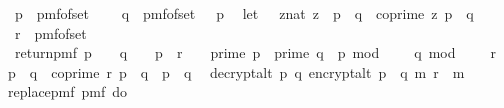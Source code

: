 \begin{isabellebody}
\ \ p\ {\isasymleftarrow}\ pmf{\isacharunderscore}{\kern0pt}of{\isacharunderscore}{\kern0pt}set\ {\isacharquery}{\kern0pt}{\isasymK}{\isacharsemicolon}{\kern0pt}\ \isanewline
\ \ q\ {\isasymleftarrow}\ pmf{\isacharunderscore}{\kern0pt}of{\isacharunderscore}{\kern0pt}set\ {\isacharparenleft}{\kern0pt}{\isacharquery}{\kern0pt}{\isasymK}\ {\isacharminus}{\kern0pt}\ {\isacharbraceleft}{\kern0pt}p{\isacharbraceright}{\kern0pt}{\isacharparenright}{\kern0pt}{\isacharsemicolon}{\kern0pt}\isanewline
\ \ let\ {\isasymZ}\ {\isacharequal}{\kern0pt}\ {\isacharbraceleft}{\kern0pt}{\isacharparenleft}{\kern0pt}z{\isacharcolon}{\kern0pt}{\isacharcolon}{\kern0pt}nat{\isacharparenright}{\kern0pt}{\isachardot}{\kern0pt}\ z\ {\isacharless}{\kern0pt}\ p\ {\isacharasterisk}{\kern0pt}\ q\ {\isasymand}\ coprime\ z\ {\isacharparenleft}{\kern0pt}p\ {\isacharasterisk}{\kern0pt}\ q{\isacharparenright}{\kern0pt}{\isacharbraceright}{\kern0pt}{\isacharsemicolon}{\kern0pt}\isanewline
\ \ r\ {\isasymleftarrow}\ pmf{\isacharunderscore}{\kern0pt}of{\isacharunderscore}{\kern0pt}set\ {\isasymZ}{\isacharsemicolon}{\kern0pt}\isanewline
\ \ return{\isacharunderscore}{\kern0pt}pmf\ {\isacharparenleft}{\kern0pt}{\isacharparenleft}{\kern0pt}{\isacharparenleft}{\kern0pt}p\ {\isasymin}\ {\isacharquery}{\kern0pt}{\isasymK}\ {\isasymand}\ q\ {\isasymin}\ {\isacharquery}{\kern0pt}{\isasymK}\ {\isacharminus}{\kern0pt}\ {\isacharbraceleft}{\kern0pt}p{\isacharbraceright}{\kern0pt}\ {\isasymand}\ r\ {\isasymin}\ {\isasymZ}{\isacharparenright}{\kern0pt}\ {\isasymor}\ {\isacharparenleft}{\kern0pt}prime\ p\ {\isasymand}\ prime\ q\ {\isasymand}\ p\ mod\ {}\ {\isacharequal}{\kern0pt}\ {}\ {\isasymand}\ q\ mod\ {}\ {\isacharequal}{\kern0pt}\ {}\ {\isasymand}\ r\ {\isacharless}{\kern0pt}\ p\ {\isacharasterisk}{\kern0pt}\ q\ {\isasymand}\ coprime\ r\ {\isacharparenleft}{\kern0pt}p\ {\isacharasterisk}{\kern0pt}\ q{\isacharparenright}{\kern0pt}\ {\isasymand}\ p\ {\isasymnoteq}\ q{\isacharparenright}{\kern0pt}{\isacharparenright}{\kern0pt}\isanewline
\ {\isasymor}\ decrypt{\isacharunderscore}{\kern0pt}alt\ p\ q\ {\isacharparenleft}{\kern0pt}encrypt{\isacharunderscore}{\kern0pt}alt\ {\isacharparenleft}{\kern0pt}p\ {\isacharasterisk}{\kern0pt}\ q{\isacharparenright}{\kern0pt}\ m\ r{\isacharparenright}{\kern0pt}\ {\isacharequal}{\kern0pt}\ m{\isacharparenright}{\kern0pt}{\isacharbraceright}{\kern0pt}{\isacharparenright}{\kern0pt}{\isachardoublequoteclose}\isanewline
\isanewline
\ \ \isamarkupfalse%
\ replace{\isacharunderscore}{\kern0pt}pmf{\isacharcolon}{\kern0pt}\ {\isachardoublequoteopen}pmf\ {\isacharparenleft}{\kern0pt}do\ {\isacharbraceleft}{\kern0pt}\isanewline

\end{isabellebody}
